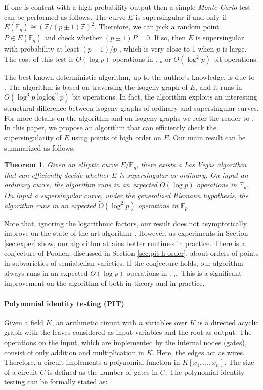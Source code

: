 \documentclass[12pt]{article}
\theoremstyle{plain}
\newtheorem{theorem}{Theorem}
\theoremstyle{definition}
\newcommand{\tildO}{\tilde{O}}
\DeclareMathOperator{\loglog}{loglog}
\def\Z{\ensuremath{\mathbb{Z}}}
\def\F{\ensuremath{\mathbb{F}}}
\begin{document}
If one is content with a high-probability output then a simple \textit{Monte Carlo} test can be 
performed as follows. The curve $E$ is supersingular if and only if $E(\F_q) \cong (\Z/(p \pm 
1)\Z)^2$. Therefore, we can pick a random point $P \in E(\F_q)$ and check whether $(p \pm 1)P = 0$. 
If so, then $E$ is supersingular with probability at least $(p - 1) / p$ \cite[Prop. 
2]{sutherland2012}, which is very close to 1 when $p$ is large. The cost of this test is 
$\tildO(\log p)$ operations in $\F_p$ or $\tildO(\log^2 p)$ bit operations.

The best known deterministic algorithm, up to the author's knowledge, is due to 
\cite{sutherland2012}. The algorithm is based on traversing the isogeny graph of $E$, and it runs 
in $O(\log^3p \loglog^2p)$ bit operations. In fact, the algorithm exploits an interesting 
structural difference between isogeny graphs of ordinary and supersingular curves. For more details 
on the algorithm and on isogeny graphs we refer the reader to \cite{sutherland2012, kohel1996}. In 
this paper, we propose an algorithm that can efficiently check the supersingularity of $E$ using 
points of high order on $E$. Our main result can be summarized as follows:
\begin{theorem}
	\label{theo:main}
	Given an elliptic curve $E/\F_q$, there exists a Las Vegas algorithm that can efficiently
	decide whether $E$ is supersingular or ordinary. On input an ordinary curve, the algorithm runs 
	in an expected $\tildO(\log p)$ operations in $\F_p$. On input a supersingular curve, under the 
	generalized Riemann hypothesis, the algorithm runs in an expected $\tildO(\log^2 p)$ operations 
	in $\F_p$.
\end{theorem}
Note that, ignoring the logarithmic factors, our result does not asymptotically improve on the 
state-of-the-art algorithm \cite{sutherland2012}. However, as experiments in Section 
\ref{sec:exper} show, our algorithm attains better runtimes in practice. There is a conjecture of 
Poonen, discussed in Section \ref{sec:pit-h-order}, about orders of points in subvarieties of 
semiabelian varieties. If the conjecture holds, our algorithm always runs in an expected 
$\tildO(\log p)$ operations in $\F_p$. This is a significant improvement on the algorithm of 
\cite{sutherland2012} both in theory and in practice.

\paragraph{Polynomial identity testing (PIT)}
Given a field $K$, an arithmetic circuit with $n$ variables over $K$ is a directed acyclic graph 
with the leaves considered as input variables and the root as output. The operations on the input, 
which are implemented by the internal nodes (gates), consist of only addition and multiplication in 
$K$. Here, the edges act as wires. Therefore, a circuit implements a polynomial function in $K[x_1, 
\dots, x_n]$. The size of a circuit $C$ is defined as the number of gates in $C$. The polynomial 
identity testing can be formally stated as: 
\end{document}
